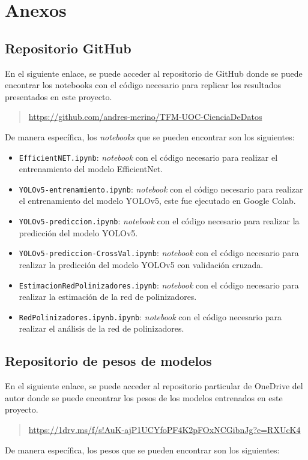 \chapter{Anexos}
\label{chapter:Anexos}

\section{Repositorio GitHub}
\label{anexo:github}

En el siguiente enlace, se puede acceder al repositorio de GitHub donde se puede encontrar los notebooks con el código necesario para replicar los resultados presentados en este proyecto.
\begin{quote}
    \url{https://github.com/andres-merino/TFM-UOC-CienciaDeDatos}
\end{quote}
De manera específica, los \textit{notebooks} que se pueden encontrar son los siguientes:

\begin{itemize}
    \item \texttt{EfficientNET.ipynb}: \textit{notebook} con el código necesario para realizar el entrenamiento del modelo EfficientNet.
    \item \texttt{YOLOv5-entrenamiento.ipynb}: \textit{notebook} con el código necesario para realizar el entrenamiento del modelo YOLOv5, este fue ejecutado en Google Colab.
    \item \texttt{YOLOv5-prediccion.ipynb}: \textit{notebook} con el código necesario para realizar la predicción del modelo YOLOv5.
    \item \texttt{YOLOv5-prediccion-CrossVal.ipynb}: \textit{notebook} con el código necesario para realizar la predicción del modelo YOLOv5 con validación cruzada.
    \item \texttt{EstimacionRedPolinizadores.ipynb}: \textit{notebook} con el código necesario para realizar la estimación de la red de polinizadores.
    \item \texttt{RedPolinizadores.ipynb.ipynb}: \textit{notebook} con el código necesario para realizar el análisis de la red de polinizadores.
\end{itemize}


\section{Repositorio de pesos de modelos}
\label{anexo:pesos}

En el siguiente enlace, se puede acceder al repositorio particular de OneDrive del autor donde se puede encontrar los pesos de los modelos entrenados en este proyecto.
\begin{quote}
    \url{https://1drv.ms/f/s!AuK-ajP1UCYfoPF4K2pFOxNCGibnJg?e=RXUcK4}
\end{quote}
De manera específica, los pesos que se pueden encontrar son los siguientes:

